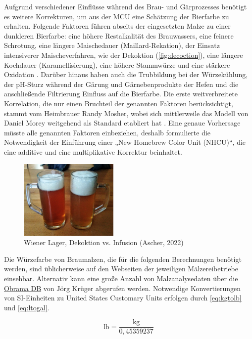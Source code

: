 \documentclass[a4paper,parskip=half]{scrartcl}
\begin{document}
Aufgrund verschiedener Einflüsse während des Brau- und Gärprozesses benötigt es weitere Korrekturen, um aus der MCU eine Schätzung der Bierfarbe zu erhalten. Folgende Faktoren führen abseits der eingesetzten Malze zu einer dunkleren Bierfarbe: eine höhere Restalkalität des Brauwassers, eine feinere Schrotung, eine längere Maischedauer (Maillard-Rekation), der Einsatz intensiverer Maischeverfahren, wie der Dekoktion (\autoref{fig:decoction}), eine längere Kochdauer (Karamellisierung), eine höhere Stammwürze und eine stärkere Oxidation \parencites{KrausWeyermann2021c}[55]{Daniels1996}. Darüber hinaus haben auch die Trubbildung bei der Würzekühlung, der pH-Sturz während der Gärung und Gärnebenprodukte der Hefen und die anschließende Filtrierung Einfluss auf die Bierfarbe. Die erste weitverbreitete Korrelation, die nur einen Bruchteil der genannten Faktoren berücksichtigt, stammt vom Heimbrauer Randy Mosher, wobei sich mittlerweile das Modell von Daniel Morey weitgehend als Standard etabliert hat \parencite{KrausWeyermann2021b}. Eine genaue Vorhersage müsste alle genannten Faktoren einbeziehen, deshalb formulierte \textcite{Colby2000} die Notwendigkeit der Einführung einer „New Homebrew Color Unit (NHCU)“, die eine additive und eine multiplikative Korrektur beinhaltet.

\begin{figure}[H]
\centering
\includegraphics[width=4.8cm]{dekoktion.jpg}
\caption{Wiener Lager, Dekoktion vs. Infusion (Ascher, 2022)}
\label{fig:decoction}
\end{figure}

Die Würzefarbe von Braumalzen, die für die folgenden Berechnungen benötigt werden, sind üblicherweise auf den Webseiten der jeweiligen Mälzereibetriebe einsehbar. Alternativ kann eine große Anzahl von Malzanalysedaten über die \href{https://obrama.mueggelland.de}{Obrama DB} von Jörg Krüger abgerufen werden. Notwendige Konvertierungen von SI-Einheiten zu United States Customary Units erfolgen durch \autoref{eq:kgtolb} und \autoref{eq:ltogal}.

\begin{equation}
\text{lb} = \frac{\text{kg}}{0,45359237}
\label{eq:kgtolb}
\end{equation}
\end{document}
